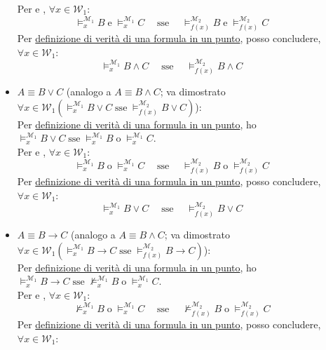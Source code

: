 \documentclass[a4paper,12pt]{article}
\newcommand{\latinmodern}[1]{\text{#1}}
\newcommand{\latinmath}[1]{\text{\latinmodern{#1}}} %
\begin{document}
\begin{dimo}
\begin{description}
\begin{itemize}
			            Per \latinmath{IH1} e \latinmath{IH2}, $\forall x \in \mathcal{W}_1$:
			            $$\vDash_x^{\mathcal{M}_1} B \; \text{e} \; \vDash_x^{\mathcal{M}_1} C \quad \; \text{sse} \quad \; \vDash_{f(x)}^{\mathcal{M}_2} B \; \text{e} \; \vDash_{f(x)}^{\mathcal{M}_2} C$$
			            Per \hyperlink{defverp}{definizione di verità di una formula in un punto}, posso concludere, $\forall x \in \mathcal{W}_1$:
			            $$\vDash_x^{\mathcal{M}_1} B \land C \quad \; \text{sse} \quad \; \vDash_{f(x)}^{\mathcal{M}_2} B \land C$$
			      \item $A \equiv B \lor C$ (analogo a $A \equiv B \land C$; va dimostrato \emph{$\forall x \in \mathcal{W}_1 (\vDash_x^{\mathcal{M}_1} B \lor C \; \text{sse} \; \vDash_{f(x)}^{\mathcal{M}_2} B \lor C)$}): \\
			            Per \hyperlink{defverp}{definizione di verità di una formula in un punto}, ho $\vDash_x^{\mathcal{M}_1} B \lor C \; \text{sse} \; \vDash_x^{\mathcal{M}_1} B \; \text{o} \; \vDash_x^{\mathcal{M}_1} C$. \\
			            Per \latinmath{IH1} e \latinmath{IH2}, $\forall x \in \mathcal{W}_1$:
			            $$\vDash_x^{\mathcal{M}_1} B \; \text{o} \; \vDash_x^{\mathcal{M}_1} C \quad \; \text{sse} \quad \; \vDash_{f(x)}^{\mathcal{M}_2} B \; \text{o} \; \vDash_{f(x)}^{\mathcal{M}_2} C$$
			            Per \hyperlink{defverp}{definizione di verità di una formula in un punto}, posso concludere, $\forall x \in \mathcal{W}_1$:
			            $$\vDash_x^{\mathcal{M}_1} B \lor C \quad \; \text{sse} \quad \; \vDash_{f(x)}^{\mathcal{M}_2} B \lor C$$
			      \item $A \equiv B \to C$ (analogo a $A \equiv B \land C$; va dimostrato \emph{$\forall x \in \mathcal{W}_1 (\vDash_x^{\mathcal{M}_1} B \to C \; \text{sse} \; \vDash_{f(x)}^{\mathcal{M}_2} B \to C)$}): \\
			            Per \hyperlink{defverp}{definizione di verità di una formula in un punto}, ho $\vDash_x^{\mathcal{M}_1} B \to C \; \text{sse} \; \nvDash_x^{\mathcal{M}_1} B \; \text{o} \; \vDash_x^{\mathcal{M}_1} C$. \\
			            Per \latinmath{IH1} e \latinmath{IH2}, $\forall x \in \mathcal{W}_1$:
			            $$\nvDash_x^{\mathcal{M}_1} B \; \text{o} \; \vDash_x^{\mathcal{M}_1} C \quad \; \text{sse} \quad \; \nvDash_{f(x)}^{\mathcal{M}_2} B \; \text{o} \; \vDash_{f(x)}^{\mathcal{M}_2} C$$
			            Per \hyperlink{defverp}{definizione di verità di una formula in un punto}, posso concludere, $\forall x \in \mathcal{W}_1$:

\end{itemize}
\end{description}
\end{dimo}
\end{document}
